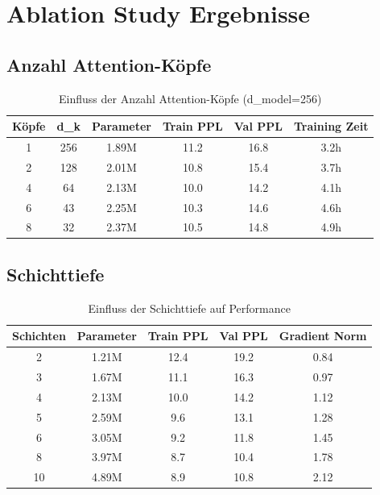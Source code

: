 \section{Ablation Study Ergebnisse}

\subsection{Anzahl Attention-Köpfe}

\begin{table}[h]
\centering
\begin{tabular}{|c|c|c|c|c|c|}
\hline
\textbf{Köpfe} & \textbf{d\_k} & \textbf{Parameter} & \textbf{Train PPL} & \textbf{Val PPL} & \textbf{Training Zeit} \\
\hline
1 & 256 & 1.89M & 11.2 & 16.8 & 3.2h \\
2 & 128 & 2.01M & 10.8 & 15.4 & 3.7h \\
4 & 64 & 2.13M & 10.0 & 14.2 & 4.1h \\
6 & 43 & 2.25M & 10.3 & 14.6 & 4.6h \\
8 & 32 & 2.37M & 10.5 & 14.8 & 4.9h \\
\hline
\end{tabular}
\caption{Einfluss der Anzahl Attention-Köpfe (d\_model=256)}
\label{tab:attention_heads_detailed}
\end{table}

\subsection{Schichttiefe}

\begin{table}[h]
\centering
\begin{tabular}{|c|c|c|c|c|}
\hline
\textbf{Schichten} & \textbf{Parameter} & \textbf{Train PPL} & \textbf{Val PPL} & \textbf{Gradient Norm} \\
\hline
2 & 1.21M & 12.4 & 19.2 & 0.84 \\
3 & 1.67M & 11.1 & 16.3 & 0.97 \\
4 & 2.13M & 10.0 & 14.2 & 1.12 \\
5 & 2.59M & 9.6 & 13.1 & 1.28 \\
6 & 3.05M & 9.2 & 11.8 & 1.45 \\
8 & 3.97M & 8.7 & 10.4 & 1.78 \\
10 & 4.89M & 8.9 & 10.8 & 2.12 \\
\hline
\end{tabular}
\caption{Einfluss der Schichttiefe auf Performance}
\label{tab:depth_detailed}
\end{table}

